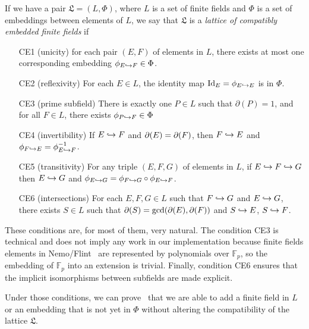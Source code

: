 \documentclass[11pt]{article}
\begin{document}
If we have a pair $\mathfrak L=(L, \Phi)$, where
$L$ is a set of finite fields and $\Phi$ is a set of embeddings between
elements of $L$, we say that $\mathfrak L$ is a \emph{lattice of compatibly
embedded finite fields} if
\begin{enumerate}
  \item[CE1] (unicity) for each pair $(E, F)$ of elements in $L$, there exists
    at most one corresponding embedding $\phi_{E\hookrightarrow F}\in\Phi$.
  \item[CE2] (reflexivity) For each $E\in L$, the identity map
    $\operatorname{Id}_E=\phi_{E\hookrightarrow E}$ is in $\Phi$.
  \item[CE3] (prime subfield) There is exactly one $P\in L$ such that $\partial
    (P) = 1$, and for all $F\in L$, there exists $\phi_{P\hookrightarrow F}\in\Phi$
  \item[CE4] (invertibility) If $E\hookrightarrow F$ and $\partial(E)=\partial(F)$, then $F\hookrightarrow E$ and
    $\phi_{F\hookrightarrow E}=\phi_{E\hookrightarrow F}^{-1}$.
  \item[CE5] (transitivity) For any triple $(E, F, G)$ of elements in $L$, if $E\hookrightarrow
    F\hookrightarrow G$ then $E\hookrightarrow G$ and
    $\phi_{E\hookrightarrow G}=\phi_{F\hookrightarrow G}\circ\phi_{E\hookrightarrow F}$.
  \item[CE6](intersections) For each $E, F, G\in L$ such that $F\hookrightarrow G$ and
    $E\hookrightarrow G$, there exists $S\in L$ such that $\partial(S)=\gcd(\partial(E), \partial(F))$
    and $S\hookrightarrow E$, $S\hookrightarrow F$.
\end{enumerate}
These conditions are, for most of them, very natural. The condition CE3 is
technical and does not imply any work in our implementation because
finite fields elements in Nemo/Flint~\cite{Nemo, Flint} are represented by
polynomials over $\mathbb{F}_p$, so the embedding of $\mathbb{F}_p$ into an
extension is trivial. Finally, condition
CE6 ensures that the implicit isomorphisms between subfields are made
explicit.

Under those conditions, we can prove~\cite{BCS97} that we are able to add a finite field in
$L$ or an embedding that is not yet in $\Phi$ without altering the compatibility
of the lattice $\mathfrak L$.
\end{document}
